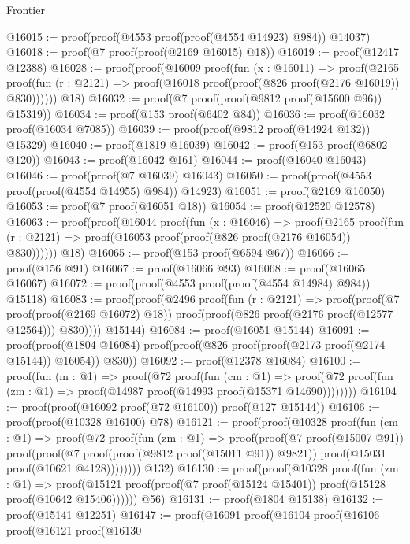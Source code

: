 \begin{lexlean}{Frontier}
\begin{coremodule}
@16015 := proof(proof(@4553 proof(proof(@4554 @14923) @984)) @14037)
@16018 := proof(@7 proof(proof(@2169 @16015) @18))
@16019 := proof(@12417 @12388)
@16028 := proof(proof(@16009
        proof(fun (x : @16011) =>
          proof(@2165
              proof(fun (r : @2121) => proof(@16018 proof(proof(@826 proof(@2176 @16019)) @830))))))
      @18)
@16032 := proof(@7 proof(proof(@9812 proof(@15600 @96)) @15319))
@16034 := proof(@153 proof(@6402 @84))
@16036 := proof(@16032 proof(@16034 @7085))
@16039 := proof(proof(@9812 proof(@14924 @132)) @15329)
@16040 := proof(@1819 @16039)
@16042 := proof(@153 proof(@6802 @120))
@16043 := proof(@16042 @161)
@16044 := proof(@16040 @16043)
@16046 := proof(proof(@7 @16039) @16043)
@16050 := proof(proof(@4553 proof(proof(@4554 @14955) @984)) @14923)
@16051 := proof(@2169 @16050)
@16053 := proof(@7 proof(@16051 @18))
@16054 := proof(@12520 @12578)
@16063 := proof(proof(@16044
        proof(fun (x : @16046) =>
          proof(@2165
              proof(fun (r : @2121) => proof(@16053 proof(proof(@826 proof(@2176 @16054)) @830))))))
      @18)
@16065 := proof(@153 proof(@6594 @67))
@16066 := proof(@156 @91)
@16067 := proof(@16066 @93)
@16068 := proof(@16065 @16067)
@16072 := proof(proof(@4553 proof(proof(@4554 @14984) @984)) @15118)
@16083 := proof(proof(@2496
        proof(fun (r : @2121) =>
          proof(proof(@7 proof(proof(@2169 @16072) @18))
              proof(proof(@826 proof(@2176 proof(@12577 @12564))) @830))))
      @15144)
@16084 := proof(@16051 @15144)
@16091 := proof(proof(@1804 @16084)
      proof(proof(@826 proof(proof(@2173 proof(@2174 @15144)) @16054)) @830))
@16092 := proof(@12378 @16084)
@16100 := proof(fun (m : @1) =>
    proof(@72
        proof(fun (cm : @1) =>
          proof(@72 proof(fun (zm : @1) => proof(@14987 proof(@14993 proof(@15371 @14690))))))))
@16104 := proof(proof(@16092 proof(@72 @16100)) proof(@127 @15144))
@16106 := proof(proof(@10328 @16100) @78)
@16121 := proof(proof(@10328
        proof(fun (cm : @1) =>
          proof(@72
              proof(fun (zm : @1) =>
                proof(proof(@7 proof(@15007 @91))
                    proof(proof(@7 proof(proof(@9812 proof(@15011 @91)) @9821))
                        proof(@15031 proof(@10621 @4128))))))))
      @132)
@16130 := proof(proof(@10328
        proof(fun (zm : @1) =>
          proof(@15121 proof(proof(@7 proof(@15124 @15401)) proof(@15128 proof(@10642 @15406))))))
      @56)
@16131 := proof(@1804 @15138)
@16132 := proof(@15141 @12251)
@16147 := proof(@16091
      proof(@16104
          proof(@16106
              proof(@16121
                  proof(@16130

\end{coremodule}
\end{lexlean}
